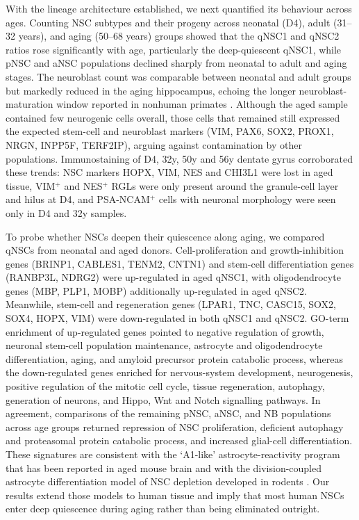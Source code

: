 \documentclass[11pt]{article}
\begin{document}
With the lineage architecture established, we next quantified its behaviour
across ages. Counting NSC subtypes and their progeny across neonatal
(D4), adult (31--32 years), and aging (50--68 years) groups showed that
the qNSC1 and qNSC2 ratios rose significantly with age, particularly the
deep-quiescent qNSC1, while pNSC and aNSC populations declined sharply
from neonatal to adult and aging stages. The neuroblast count was
comparable between neonatal and adult groups but markedly reduced in the
aging hippocampus, echoing the longer neuroblast-maturation window
reported in nonhuman primates \cite{kohler2011maturation}. Although the
aged sample contained few neurogenic cells overall, those cells that
remained still expressed the expected stem-cell and neuroblast markers
(VIM, PAX6, SOX2, PROX1, NRGN, INPP5F, TERF2IP), arguing against
contamination by other populations. Immunostaining of D4, 32y, 50y and
56y dentate gyrus corroborated these trends: NSC markers HOPX, VIM, NES
and CHI3L1 were lost in aged tissue, VIM$^+$ and NES$^+$ RGLs were only
present around the granule-cell layer and hilus at D4, and PSA-NCAM$^+$
cells with neuronal morphology were seen only in D4 and 32y samples.

To probe whether NSCs deepen their quiescence along aging, we compared
qNSCs from neonatal and aged donors. Cell-proliferation and growth-inhibition
genes (BRINP1, CABLES1, TENM2, CNTN1) and stem-cell differentiation genes
(RANBP3L, NDRG2) were up-regulated in aged qNSC1, with oligodendrocyte
genes (MBP, PLP1, MOBP) additionally up-regulated in aged qNSC2.
Meanwhile, stem-cell and regeneration genes (LPAR1, TNC, CASC15, SOX2,
SOX4, HOPX, VIM) were down-regulated in both qNSC1 and qNSC2. GO-term
enrichment of up-regulated genes pointed to negative regulation of growth,
neuronal stem-cell population maintenance, astrocyte and oligodendrocyte
differentiation, aging, and amyloid precursor protein catabolic process,
whereas the down-regulated genes enriched for nervous-system development,
neurogenesis, positive regulation of the mitotic cell cycle, tissue
regeneration, autophagy, generation of neurons, and Hippo, Wnt and Notch
signalling pathways. In agreement, comparisons of the remaining pNSC,
aNSC, and NB populations across age groups returned repression of NSC
proliferation, deficient autophagy and proteasomal protein catabolic
process, and increased glial-cell differentiation. These signatures are
consistent with the `A1-like' astrocyte-reactivity program that has been
reported in aged mouse brain \cite{clarke2018normal,liddelow2017neurotoxic}
and with the division-coupled astrocyte differentiation model of NSC
depletion developed in rodents \cite{encinas2011division}. Our results
extend those models to human tissue and imply that most human NSCs enter
deep quiescence during aging rather than being eliminated outright.
\end{document}
